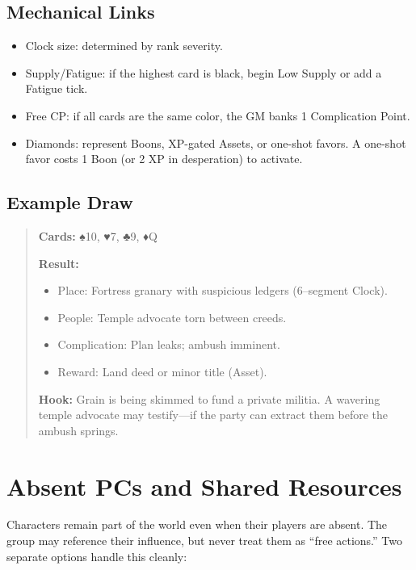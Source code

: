 \documentclass[12pt]{book}
\begin{document}
\subsection{Mechanical Links}
\begin{itemize}
  \item Clock size: determined by rank severity.
  \item Supply/Fatigue: if the highest card is black, begin Low Supply or add a Fatigue tick.
  \item Free CP: if all cards are the same color, the GM banks 1 Complication Point.
  \item Diamonds: represent Boons, XP-gated Assets, or one-shot favors. A one-shot favor costs 1 Boon (or 2 XP in desperation) to activate.
\end{itemize}

\subsection{Example Draw}
\begin{quote}
\textbf{Cards:} ♠10, ♥7, ♣9, ♦Q

\textbf{Result:}
\begin{itemize}
  \item Place: Fortress granary with suspicious ledgers (6--segment Clock).
  \item People: Temple advocate torn between creeds.
  \item Complication: Plan leaks; ambush imminent.
  \item Reward: Land deed or minor title (Asset).
\end{itemize}
\textbf{Hook:} Grain is being skimmed to fund a private militia. A wavering temple advocate may testify—if the party can extract them before the ambush springs.
\end{quote}

\section{Absent PCs and Shared Resources}

Characters remain part of the world even when their players are absent. The group may reference their influence, but never treat them as “free actions.” Two separate options handle this cleanly:
\end{document}
